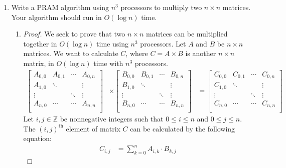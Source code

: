 \documentclass{article}
\renewcommand{\_}{\ifincsname_\else\legacyunderscore\fi}
\begin{document}
\begin{enumerate}
	\item Write a PRAM algorithm using $n^3$ processors to multiply two $n\times n$ matrices. Your algorithm should run in $O(\log n)$ time.
	\begin{enumerate}
		\item 
\begin{proof}
	We seek to prove that two $n\times n$ matrices can be multiplied together in $O(\log n)$ time using $n^3$ processors. Let $A$ and $B$ be $n\times n$ matrices. We want to calculate $C$, where $C = A\times B$ is another $n\times n$ matrix, in $O(\log n)$ time with $n^3$ processors. 
\begin{equation}
\begin{aligned}
\nonumber
\begin{bmatrix}
A_{0, 0} 	& A_{0, 1} 	& \cdots 	& A_{0, n} \\
A_{1, 0} 	& \ddots 	& 	 	& \vdots \\
\vdots 	& 	 	& \ddots 	& \vdots \\
A_{n, 0}	& \cdots 	& \cdots 	& A_{n, n}\\
\end{bmatrix} & \times
\begin{bmatrix}
B_{0, 0} 	& B_{0, 1} 	& \cdots 	& B_{0, n} \\
B_{1, 0} 	& \ddots 	& 	 	& \vdots \\
\vdots 	& 	 	& \ddots 	& \vdots \\
B_{n, 0}	& \cdots 	& \cdots 	& B_{n, n}\\
\end{bmatrix} &= 
\begin{bmatrix}
C_{0, 0} 	& C_{0, 1} 	& \cdots 	& C_{0, n} \\
C_{1, 0} 	& \ddots 	& 	 	& \vdots \\
\vdots 	& 	 	& \ddots 	& \vdots \\
C_{n, 0}	& \cdots 	& \cdots 	& C_{n, n}\\
\end{bmatrix}
\end{aligned}
\end{equation}
Let $i, j \in \mathbb{Z}$ be nonnegative integers such that $0\leq i \leq n$ and $0\leq j \leq n$. The $\left(i, j\right)^{\text{th}}$ element of matrix $C$ can be calculated by the following equation:
\begin{equation}
\begin{aligned}
C_{i,j} &= \sum_{k=0}^{n} A_{i, k}\cdot B_{k, j}
\end{aligned}
\end{equation}

\end{proof}
\end{enumerate}
\end{enumerate}
\end{document}
